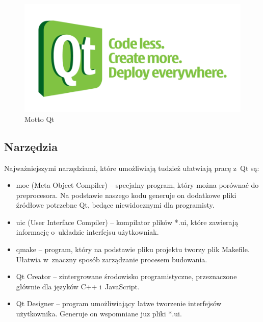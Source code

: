 \begin{figure}
\centering
\includegraphics[scale=0.7]{img/qt-rule.png}
\caption{Motto Qt}
\end{figure}

\subsection{Narzędzia}
Najważniejszymi narzędziami, które umożliwiają tudzież ułatwiają pracę z~Qt są:
\begin{itemize}
\item moc (Meta Object Compiler) -- specjalny program, który można porównać do preprocesora. Na podstawie naszego kodu generuje on dodatkowe pliki źródłowe potrzebne Qt, bedące niewidocznymi dla programisty.
\item uic (User Interface Compiler) -- kompilator plików *.ui, które zawierają informację o~układzie interfejsu użytkowniak.
\item qmake -- program, który na podstawie pliku projektu tworzy plik Makefile. Ułatwia w~znaczny sposób zarządzanie procesem budowania.
\item Qt Creator -- zintergrowane środowisko programistyczne, przeznaczone głównie dla języków C++ i~JavaScript.
\item Qt Designer -- program umożliwiający łatwe tworzenie interfejsów użytkownika. Generuje on wspomniane juz pliki *.ui.
\end{itemize}


